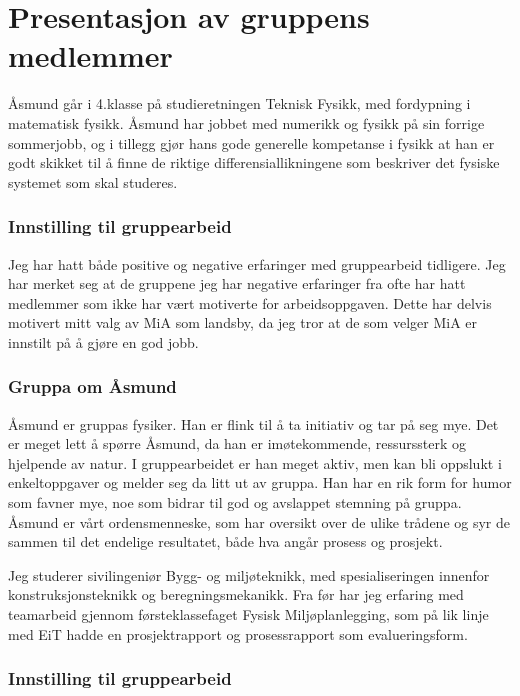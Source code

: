 \chapter{Presentasjon av gruppens medlemmer}
Åsmund går i 4.klasse på studieretningen Teknisk Fysikk, med fordypning 
i matematisk fysikk. Åsmund har jobbet med numerikk og fysikk på sin forrige 
sommerjobb, og i tillegg gjør hans gode generelle kompetanse i fysikk at han 
er godt skikket til å finne de riktige differensiallikningene som beskriver
det fysiske systemet som skal studeres.

\subsection*{Innstilling til gruppearbeid}
Jeg har hatt både positive og negative erfaringer med gruppearbeid tidligere.
Jeg har merket seg at de gruppene jeg har negative erfaringer fra ofte har hatt
medlemmer som ikke har vært motiverte for arbeidsoppgaven. Dette har delvis
motivert mitt valg av MiA som landsby, da jeg tror at de som velger MiA er
innstilt på å gjøre en god jobb.

\subsection*{Gruppa om Åsmund}

Åsmund er gruppas fysiker. Han er flink til å ta initiativ og tar på seg mye.
Det er meget lett å spørre Åsmund, da han er imøtekommende, ressurssterk og
hjelpende av natur. I gruppearbeidet er han meget aktiv, men kan bli oppslukt i enkeltoppgaver og
melder seg da litt ut av gruppa. Han har en rik form for humor som favner
mye, noe som bidrar til god og avslappet stemning på gruppa. Åsmund er vårt
ordensmenneske, som har oversikt over de ulike trådene og syr de sammen til det
endelige resultatet, både hva angår prosess og prosjekt.

Jeg studerer sivilingeniør Bygg- og miljøteknikk, med
spesialiseringen innenfor konstruksjonsteknikk og beregningsmekanikk. Fra før
har jeg erfaring med teamarbeid gjennom førsteklassefaget Fysisk
Miljøplanlegging, som på lik linje med EiT hadde en prosjektrapport og
prosessrapport som evalueringsform.

\subsection*{Innstilling til gruppearbeid}

